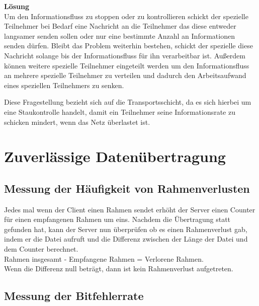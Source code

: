 \documentclass{scrartcl}
\begin{document}
     \textbf{Lösung}\\
     Um den Informationsfluss zu stoppen oder zu kontrollieren schickt der spezielle Teilnehmer bei Bedarf eine Nachricht an die Teilnehmer das diese entweder langsamer senden sollen oder nur eine bestimmte Anzahl an Informationen senden dürfen. Bleibt das Problem weiterhin bestehen, schickt der spezielle diese Nachricht solange bis der Informationsfluss für ihn verarbeitbar ist.
     Außerdem können weitere spezielle Teilnehmer eingeteilt werden um den Informationsfluss an mehrere spezielle Teilnehmer zu verteilen und dadurch den Arbeitsaufwand eines speziellen Teilnehmers zu senken.
     
     Diese Fragestellung bezieht sich auf die Transportsschicht, da es sich hierbei um eine Staukontrolle handelt, damit ein Teilnehmer seine Informationsrate zu schicken mindert, wenn das Netz überlastet ist.

  \newpage
\section[Versuch 2 Zuverlässige Datenübertragung]{Zuverlässige Datenübertragung}
  \subsection[Aufgabe 2 Messung der Häufigkeit von Rahmenverlusten]{Messung der Häufigkeit von Rahmenverlusten}
  
  Jedes mal wenn der Client einen Rahmen sendet erhöht der Server einen Counter für einen empfangenen Rahmen um eins. Nachdem die Übertragung statt gefunden hat, kann der Server nun überprüfen ob es einen Rahmenverlust gab, indem er die Datei aufruft und die Differenz zwischen der Länge der Datei und dem Counter berechnet. \\
Rahmen insgesamt - Empfangene  Rahmen = Verlorene Rahmen.\\
Wenn die Differenz null beträgt, dann ist kein Rahmenverlust aufgetreten.

  \subsection[Aufgabe 3 Messung der Bitfehlerrate]{Messung der Bitfehlerrate}
 
\end{document}
